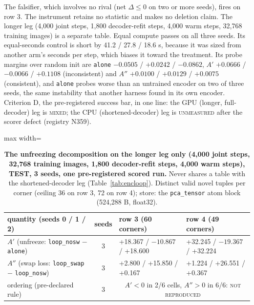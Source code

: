 \documentclass{article} %
\begin{document}
\noindent The falsifier, which involves no rival (net $\Delta\le0$ on two or more seeds), fires on
row 3.
The instrument retains no statistic and makes no deletion claim. %
The longer leg (4,000 joint steps, 1,800 decoder-refit steps, 4,000 warm steps, 32,768 training
images) is a separate table. Equal compute passes on all three seeds. Its equal-seconds control is
short by 41.2 / 27.8 / 18.6 s, because it was sized from another arm's seconds per step, which
biases it toward the treatment. Its probe margins over random init are \texttt{alone} $-0.0505$ / $+0.0242$ /
$-0.0862$, $A'$ $+0.0666$ / $-0.0066$ / $+0.1108$ (inconsistent) and $A''$ $+0.0100$ / $+0.0129$ /
$+0.0075$ (consistent), and \texttt{alone} probes worse than an untrained encoder on two of three
seeds, the same instability that another harness found in its own encoder. %
Criterion D, the pre-registered success bar, in one line: the GPU (longer, full-decoder) leg is \textsc{mixed}; the CPU (shortened-decoder) leg is \textsc{unmeasured} after the scorer defect (registry N359). %

\begin{table}[h]
\centering\small
\caption{\textbf{The unfreezing decomposition on the longer leg only (4,000 joint steps, %
32,768 training images, 1,800 decoder-refit steps, 4,000 warm steps), TEST, 3 seeds, %
one pre-registered scored run.} Never shares a table with the shortened-decoder leg
(Table~\ref{tab:encloop}). Distinct valid novel tuples per corner (ceiling 36 on row 3, 72 on
row 4); store: the \texttt{pca\_tensor} atom block (524,288 B, float32).} %
\label{tab:bard-gpu}
\setlength{\tabcolsep}{2.4pt}
\begin{adjustbox}{max width=\linewidth}\begin{tabular}{lcp{4.6cm}p{4.6cm}}
\toprule
quantity (seeds 0 / 1 / 2) & seeds & row 3 (60 corners) & row 4 (49 corners) \\ %
\midrule
$A'$ (unfreeze: \texttt{loop\_nosw} $-$ \texttt{alone}) & 3 & +18.367 / $-10.867$ / +18.600 & +32.245 / $-19.367$ / +32.224 \\
$A''$ (swap loss: \texttt{loop\_swap} $-$ \texttt{loop\_nosw}) & 3 & +2.800 / +15.850 / +0.167 & +1.224 / +26.551 / +0.367 \\
ordering (pre-declared rule) & 3 & \multicolumn{2}{c}{$A'<0$ in 2/6 cells, $A''>0$ in 6/6: \textsc{not reproduced}} \\
\bottomrule
\end{tabular}\end{adjustbox}
\end{table}
\end{document}
